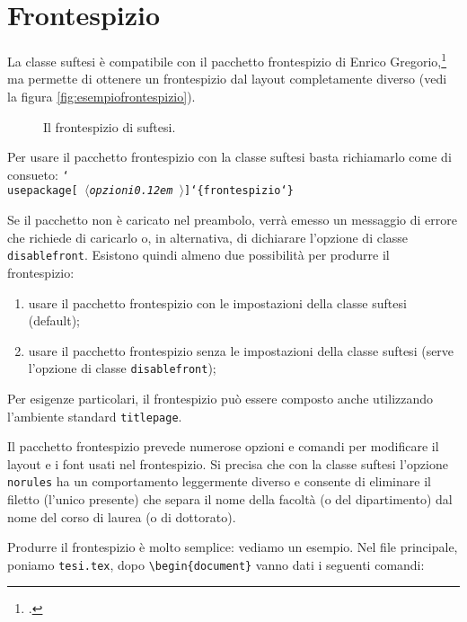 \documentclass{suftesi}
\DeclareRobustCommand*{\cs}[1]{\texttt{\char`\\#1}}
\DeclareRobustCommand*{\ar}[1]{\texttt{\char`\{#1\char`\}}}
\DeclareRobustCommand*{\oar}[1]{\texttt{[#1]}}
\DeclareRobustCommand*{\meta}[1]{%
  $\langle${\normalfont\itshape#1\kern0.12em }$\rangle$}
\DeclareRobustCommand*{\oarm}[1]{\oar{\meta{#1}}}
\newcommand*{\env}[1]{\texttt{#1}}
\newcommand*{\option}{\texttt}
\newcommand{\pack}{\textsf}
\newcommand*{\File}{\texttt}
\def\suftesi{\textsf{suftesi}}
\newenvironment{ttquote}
  {\genquote[\ttfamily\microtypesetup{activate=false}]}
  {\endgenquote}
\begin{document}
\chapter{Frontespizio} 

La classe \suftesi{} è compatibile con il pacchetto \pack{frontespizio} di Enrico Gregorio,\footcite{Gregorio:frontespizio} ma permette di ottenere un frontespizio dal layout completamente diverso (vedi la figura \vref{fig:esempiofrontespizio}).
\begin{figure}[!h]
\centerline{}
\caption[Il frontespizio di \suftesi{}]{Il frontespizio di \suftesi{}.}\label{fig:esempiofrontespizio}
\end{figure}

Per usare il pacchetto \pack{frontespizio} con la classe \suftesi{} basta richiamarlo come di consueto:
\begin{ttquote}
\cs{usepackage}\oarm{opzioni}\ar{frontespizio}
\end{ttquote}

Se il pacchetto non è caricato nel preambolo, verrà emesso un messaggio di errore che richiede di caricarlo o, in alternativa, di dichiarare l'opzione di classe \option{disablefront}. 
Esistono quindi almeno due possibilità per produrre il frontespizio:
\begin{enumerate}
\item usare il pacchetto \pack{frontespizio} con le impostazioni della classe \suftesi{} (default);
\item usare il pacchetto \pack{frontespizio} senza le impostazioni della classe \suftesi{} (serve l'opzione di classe \option{disablefront});
 \end{enumerate}
Per esigenze particolari, il frontespizio può essere composto anche utilizzando l'ambiente standard \env{titlepage}.

Il pacchetto \pack{frontespizio} prevede numerose opzioni e comandi per modificare il layout e i font usati nel frontespizio. Si precisa che con la classe \suftesi{} l'opzione \option{norules} ha un comportamento leggermente diverso e consente di eliminare il filetto (l'unico presente) che separa il nome della facoltà (o del dipartimento) dal nome del corso di laurea (o di dottorato).

Produrre il frontespizio è molto semplice: vediamo un esempio. Nel file principale, poniamo \File{tesi.tex}, dopo \verb|\begin{document}| vanno
dati i seguenti comandi:
\end{document}
